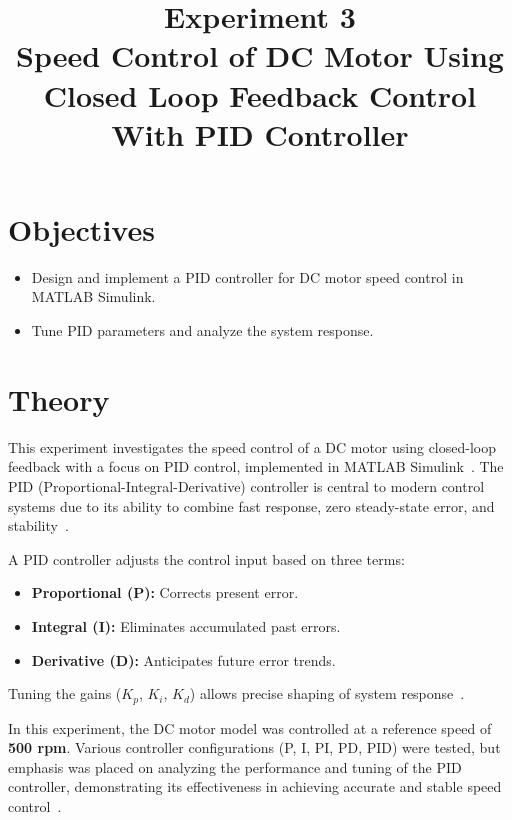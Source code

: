 \documentclass[12pt]{article}
\title{Experiment 3\\
\textbf{Speed Control of DC Motor Using Closed Loop Feedback Control With PID Controller}}
\author{}
\date{}
\begin{document}


\pagebreak

\tableofcontents

\pagebreak
{}
\maketitle

\vspace{-5em}

\section*{Objectives}
\begin{itemize}
  \item Design and implement a PID controller for DC motor speed control in MATLAB Simulink.
  \item Tune PID parameters and analyze the system response.
\end{itemize}

\section*{Theory}
This experiment investigates the speed control of a DC motor using closed-loop feedback with a focus on PID control, implemented in MATLAB Simulink~\cite{mathworks2023simulink}. The PID (Proportional-Integral-Derivative) controller is central to modern control systems due to its ability to combine fast response, zero steady-state error, and stability~\cite{ogata2010modern,nise2019control}.

A PID controller adjusts the control input based on three terms:
\begin{itemize}
  \item \textbf{Proportional (P):} Corrects present error.
  \item \textbf{Integral (I):} Eliminates accumulated past errors.
  \item \textbf{Derivative (D):} Anticipates future error trends.
\end{itemize}
Tuning the gains ($K_p$, $K_i$, $K_d$) allows precise shaping of system response~\cite{astrom1995pid}.

In this experiment, the DC motor model was controlled at a reference speed of \textbf{500 rpm}. Various controller configurations (P, I, PI, PD, PID) were tested, but emphasis was placed on analyzing the performance and tuning of the PID controller, demonstrating its effectiveness in achieving accurate and stable speed control~\cite{ogata2010modern}.
\end{document}
